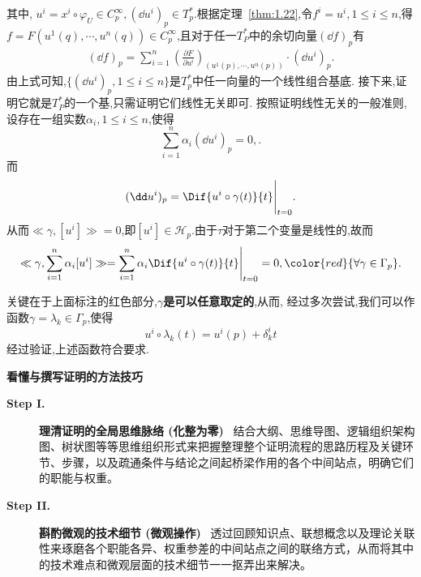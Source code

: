 \begin{fancybox}
\begin{center}
\end{center}
其中, $u^i=x^i\circ \varphi_U\in C_p^\infty,(\dd u^i)_p\in T_p^*$.根据定理~\ref{thm:1.22},令$f^i=u^i,1\leqslant i\leqslant n$,得$ f=F(u^1(q),\cdots,u^n(q))\in C_p^\infty$,且对于任一$T_P^*$中的余切向量$(\dd f)_p$有
\begin{align*}
(\dd f)_p=\sum_{i=1}^{n}\left(\frac{\partial F}{\partial u^i}\right)_{(u^1(p),\cdots,u^n(p))}\cdot (\dd u^i)_p.
\end{align*}
由上式可知,$\{(\dd u^i)_p,1\leqslant i\leqslant n\}$是$T_p^*$中任一向量的一个线性组合基底.
接下来,证明它就是$T_P^*$的一个基,只需证明它们线性无关即可.
按照证明线性无关的一般准则,设存在一组实数$\alpha_i,1\leqslant i\leqslant n$,使得
\begin{equation*}
\sum_{i=1}^{n}\alpha_i (\dd u^i)_p=0,.
\end{equation*}
而
\begin{align*}
(\dd u^i)_p=\Dif{u^i\circ \gamma(t)}{t}\Bigg|_{t=0}.
\end{align*}
从而$\ll\gamma,[u^i]\gg=0$,即$[u^i]\in\mathscr{H}_p$.由于$\tau$对于第二个变量是线性的,故而
\[\ll \gamma,\sum_{i=1}^{n}\alpha_i [u^i]\gg=\sum_{i=1}^{n}\alpha_i \Dif{u^i\circ\gamma(t)}{t}\Bigg|_{t=0}=0,\color{red}{\forall \gamma\in\Gamma_p}.\]

关键在于上面标注的红色部分,\textbf{$\gamma$是可以任意取定的},从而, 经过多次尝试,我们可以作函数$\gamma=\lambda_k\in \Gamma_p$,使得
\begin{equation*}
u^i\circ\lambda_k(t)=u^i(p)+\delta_k^i t
\end{equation*}
经过验证,上述函数符合要求.
\end{fancybox}
\begin{fancybox}
\textbf{\textcolor[rgb]{0.88,0.15,0.33}{看懂与撰写证明的方法技巧}}
\begin{description}
    \item[\textbf{Step I.}] \textbf{理清证明的全局思维脉络 (化整为零)}~
    结合大纲、思维导图、逻辑组织架构图、树状图等等思维组织形式来把握整理整个证明流程的思路历程及关键环节、步骤，以及疏通条件与结论之间起桥梁作用的各个中间站点，明确它们的职能与权重。
    \item[\textbf{Step II.}] \textbf{斟酌微观的技术细节 (微观操作)}~
    透过回顾知识点、联想概念以及理论关联性来琢磨各个职能各异、权重参差的中间站点之间的联络方式，从而将其中的技术难点和微观层面的技术细节一一抠弄出来解决。
\end{description}
\end{fancybox}

